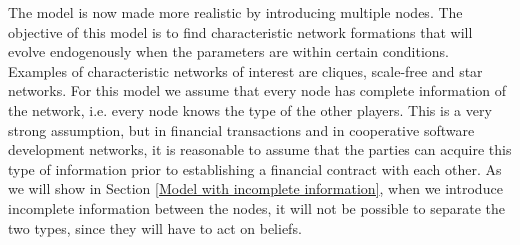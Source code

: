The model is now made more realistic by introducing multiple nodes. The objective of this model is to find characteristic network formations that will evolve endogenously when the parameters are within certain conditions. 
Examples of characteristic networks of interest are cliques, scale-free and star networks.
For this model we assume that every node has complete information of the network, i.e. every node knows the type of the other players. 
This is a very strong assumption, but in financial transactions and in cooperative software development networks, it is reasonable to assume that the parties can acquire this type of information prior to establishing a financial contract with each other. As we will show in Section \ref{Model with incomplete information}, when we introduce incomplete information between the nodes, it will not be possible to separate the two types, since they will have to act on beliefs.
